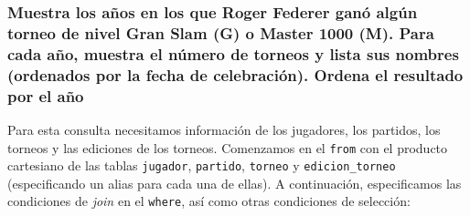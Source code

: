 \documentclass[11pt]{opticajnl}
\begin{document}
\subsubsection{Muestra los años en los que Roger Federer ganó algún torneo de nivel Gran Slam (G) o Master 1000 (M). Para cada año, muestra el número de torneos y lista sus nombres (ordenados por la fecha de celebración). Ordena el resultado por el año}

Para esta consulta necesitamos información de los jugadores, los partidos, los torneos y las ediciones de los torneos. Comenzamos en el \texttt{from} con el producto cartesiano de las tablas \texttt{jugador}, \texttt{partido}, \texttt{torneo} y \texttt{edicion\_torneo} (especificando un alias para cada una de ellas). A continuación, especificamos las condiciones de \textit{join} en el \texttt{where}, así como otras condiciones de selección:
\end{document}
